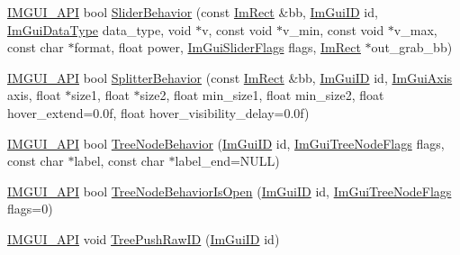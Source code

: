 \begin{DoxyCompactItemize}
\item 
\mbox{\hyperlink{imgui_8h_a43829975e84e45d1149597467a14bbf5}{I\+M\+G\+U\+I\+\_\+\+A\+PI}} bool \mbox{\hyperlink{namespace_im_gui_a4e0edc9434473ac6590d8d8af2291f24}{Slider\+Behavior}} (const \mbox{\hyperlink{struct_im_rect}{Im\+Rect}} \&bb, \mbox{\hyperlink{imgui_8h_a1785c9b6f4e16406764a85f32582236f}{Im\+Gui\+ID}} id, \mbox{\hyperlink{imgui_8h_a4cfa8697a3d76722fff83eb18922e9d5}{Im\+Gui\+Data\+Type}} data\+\_\+type, void $\ast$v, const void $\ast$v\+\_\+min, const void $\ast$v\+\_\+max, const char $\ast$format, float power, \mbox{\hyperlink{imgui__internal_8h_a50cc3e3e4beb155e2186f8c1dc057e18}{Im\+Gui\+Slider\+Flags}} flags, \mbox{\hyperlink{struct_im_rect}{Im\+Rect}} $\ast$out\+\_\+grab\+\_\+bb)
\item 
\mbox{\hyperlink{imgui_8h_a43829975e84e45d1149597467a14bbf5}{I\+M\+G\+U\+I\+\_\+\+A\+PI}} bool \mbox{\hyperlink{namespace_im_gui_a9d222e1384c6c56ff61b61cfa3016855}{Splitter\+Behavior}} (const \mbox{\hyperlink{struct_im_rect}{Im\+Rect}} \&bb, \mbox{\hyperlink{imgui_8h_a1785c9b6f4e16406764a85f32582236f}{Im\+Gui\+ID}} id, \mbox{\hyperlink{imgui__internal_8h_a468e54d5ed387abfbf0d1fc1e33ab483}{Im\+Gui\+Axis}} axis, float $\ast$size1, float $\ast$size2, float min\+\_\+size1, float min\+\_\+size2, float hover\+\_\+extend=0.\+0f, float hover\+\_\+visibility\+\_\+delay=0.\+0f)
\item 
\mbox{\hyperlink{imgui_8h_a43829975e84e45d1149597467a14bbf5}{I\+M\+G\+U\+I\+\_\+\+A\+PI}} bool \mbox{\hyperlink{namespace_im_gui_a918eabf70d288e93b2519ee1eac2c0b4}{Tree\+Node\+Behavior}} (\mbox{\hyperlink{imgui_8h_a1785c9b6f4e16406764a85f32582236f}{Im\+Gui\+ID}} id, \mbox{\hyperlink{imgui_8h_a0588fdd10c59b49a0159484fe9ec4564}{Im\+Gui\+Tree\+Node\+Flags}} flags, const char $\ast$label, const char $\ast$label\+\_\+end=N\+U\+LL)
\item 
\mbox{\hyperlink{imgui_8h_a43829975e84e45d1149597467a14bbf5}{I\+M\+G\+U\+I\+\_\+\+A\+PI}} bool \mbox{\hyperlink{namespace_im_gui_a22cc50485aad6da8a3a4e156b500ed4a}{Tree\+Node\+Behavior\+Is\+Open}} (\mbox{\hyperlink{imgui_8h_a1785c9b6f4e16406764a85f32582236f}{Im\+Gui\+ID}} id, \mbox{\hyperlink{imgui_8h_a0588fdd10c59b49a0159484fe9ec4564}{Im\+Gui\+Tree\+Node\+Flags}} flags=0)
\item 
\mbox{\hyperlink{imgui_8h_a43829975e84e45d1149597467a14bbf5}{I\+M\+G\+U\+I\+\_\+\+A\+PI}} void \mbox{\hyperlink{namespace_im_gui_afddcddce9f2801769e4c79ef769ab600}{Tree\+Push\+Raw\+ID}} (\mbox{\hyperlink{imgui_8h_a1785c9b6f4e16406764a85f32582236f}{Im\+Gui\+ID}} id)
\item 

\end{DoxyCompactItemize}
